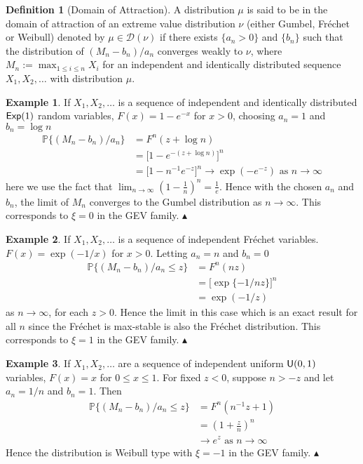 \documentclass[a4paper,10pt]{article}
\theoremstyle{definition}
\newtheorem{defn}[thm]{Definition}
\newtheorem*{examp}{Example}
\numberwithin{equation}{section}
\newcommand\xqed[1]{%
  \leavevmode\unskip\penalty9999 \hbox{}\nobreak\hfill
  \quad\hbox{#1}}
\newcommand\eqed{\xqed{$\blacktriangle$}}
\begin{document}
\begin{defn}[Domain of Attraction]
A distribution $\mu$ is said to be in the domain of attraction of an extreme value distribution $\nu$ (either Gumbel, Fr\'echet or Weibull) denoted by $\mu \in \mathcal{D}(\nu) $ if there exists $\{a_n>0\}$ and $\{b_n\}$ such that the distribution of $(M_n-b_n)/a_n$ converges weakly to $\nu$, where $M_n:=\max_{1\leq i \leq n}X_i$ for an independent and identically distributed sequence $X_1, X_2, \ldots$ with distribution $\mu$.
\end{defn}

\begin{examp}
If $X_1, X_2, \ldots$ is a sequence of independent and identically distributed $\text{\sffamily Exp}(1)$ random variables, $F(x) = 1-e^{-x}$ for $x>0$, choosing $a_n = 1$ and $b_n = \log n$
\begin{align*}
\mathbb{P}\{(M_n-b_n)/a_n\} &= F^n(z + \log n)\\
&= \bigg[1-e^{-(z+\log n)}\bigg]^n\\
&= \bigg[1-n^{-1}e^{-z}\bigg]^n \to \exp(-e^{-z}) \text{ as } n \to \infty
\end{align*}
here we use the fact that $\lim_{n \to \infty} \left(1-\frac{1}{n}\right)^n = \frac{1}{e}$. Hence with the chosen $a_n$ and $b_n$, the limit of $M_n$ converges to the Gumbel distribution as $n \to \infty$. This corresponds to $\xi = 0$ in the GEV family. \eqed
\end{examp}

\begin{examp}
If $X_1, X_2, \ldots$ is a sequence of independent Fr\'echet variables. $F(x) = \exp(-1/x)$ for $x>0$. Letting $a_n = n$ and $b_n = 0$
\begin{align*}
\mathbb{P}\{(M_n-b_n)/a_n\leq z\}  & = F^n(nz)\\
& = \Big[\exp\{-1/nz\}\Big]^n\\
& = \exp(-1/z)
\end{align*}
as $n \to \infty$, for each $z>0$. Hence the limit in this case which is an exact result for all $n$ since the Fr\'echet is max-stable is also the Fr\'echet distribution. This corresponds to $\xi = 1$ in the GEV family.
\eqed
\end{examp}

\begin{examp}
If $X_1, X_2, \ldots$ are a sequence of independent uniform $\text{\sffamily U}(0,1)$ variables, $F(x)=x$ for $0 \leq x \leq 1$. For fixed $z < 0$, suppose $n>-z$ and let $a_n = 1/n$ and $b_n = 1$. Then
\begin{align*}
\mathbb{P}\{(M_n-b_n)/a_n\leq z\} &= F^n(n^{-1}z+1)\\
&= \left(1+\frac{z}{n}\right)^n\\
&\to e^z \text{ as } n \to \infty
\end{align*}
Hence the distribution is Weibull type with $\xi=-1$ in the GEV family.
\eqed
\end{examp}
\end{document}
